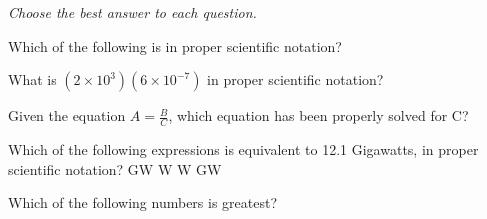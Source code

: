 \documentclass[12pt]{examdesign}
\begin{document}
\begin{multiplechoice} [title={Multiple Choice},
	rearrange=no]
	\textit{Choose the best answer to each question.} 
	
	\begin{question}
	Which of the following is in proper scientific notation?
	\end{question}

	\begin{question}
	What is $ (2 \times 10^3) (6 \times 10^{-7}) $ in proper scientific notation?
	\choice [!]{$1.2 \times 10^{-3} $ }
	\choice {$12 \times 10^{-4}$}
	\choice {$8 \times 10^{21}$}
	\choice {$4 \times 10^{-10}$ }
\end{question}

\begin{question}
	Given the equation $A = \frac{B}{C} $, which equation has been properly solved for C?
	
	\end{question}

\begin{question}
	Which of the following expressions is equivalent to 12.1 Gigawatts, in proper scientific notation?
	GW
	W
	W
	GW
	
\end{question}

\begin{question}
	Which of the following numbers is greatest?

\end{question}


\end{multiplechoice}
	\pagebreak
\end{document}
